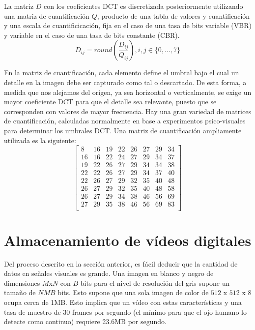 La matriz $D$ con los coeficientes DCT es discretizada posteriormente utilizando una matriz de cuantificación $Q$, producto de una tabla de valores y cuantificación y una escala de cuantificicación, fija en el caso de una tasa de bits variable (VBR) y variable en el caso de una tasa de bits constante (CBR). 
\begin{equation}
D_{ij} = round\left(\frac{D_{ij}}{Q_{ij}}\right),  i,j\in\{0, \dots, 7\} \nonumber
\end{equation}

En la matriz de cuantificación, cada elemento define el umbral bajo el cual un detalle en la imagen debe ser capturado como tal o descartado. De esta forma, a medida que nos alejamos del origen, ya sea horizontal o verticalmente, se exige un mayor coeficiente DCT para que el detalle sea relevante, puesto que se corresponden con valores de mayor frecuencia. Hay una gran variedad de matrices de cuantificación, calculadas normalmente en base a experimentos psico-visuales para determinar los umbrales DCT. Una matriz de cuantificación ampliamente utilizada es la siguiente\cite{b3:2012}:
$$
\begin{bmatrix}
8 & 16 & 19 & 22 & 26 & 27 & 29 & 34 \\
16 & 16 & 22 & 24 & 27 & 29 & 34 & 37 \\
19 & 22 & 26 & 27 & 29 & 34 & 34 & 38 \\
22 & 22 & 26 & 27 & 29 & 34 & 37 & 40 \\
22 & 26 & 27 & 29 & 32 & 35 & 40 & 48 \\
26 & 27 & 29 & 32 & 35 & 40 & 48 & 58 \\
26 & 27 & 29 & 34 & 38 & 46 & 56 & 69 \\
27 & 29 & 35 & 38 & 46 & 56 & 69 & 83 \\
\end{bmatrix}
$$

\section{Almacenamiento de vídeos digitales}
Del proceso descrito en la sección anterior, es fácil deducir que la cantidad de datos en se\~nales visuales es grande. Una imagen en blanco y negro de dimensiones $M$x$N$ con $B$ bits para el nivel de resolución del gris supone un tama\~no de $NMB$ bits. Esto supone que una sola imagen de color de $512$ x $512$ x $8$ ocupa cerca de 1MB. Esto implica que un vídeo con estas características y una tasa de muestro de 30 frames por segundo (el mínimo para que el ojo humano lo detecte como continuo) requiere 23.6MB por segundo\cite{b2:2005}.\\

